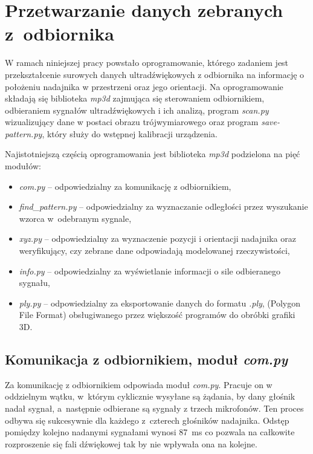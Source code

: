 
\chapter{Przetwarzanie danych zebranych z~odbiornika}

W ramach niniejszej pracy powstało oprogramowanie, którego zadaniem jest
przekształcenie surowych danych ultradźwiękowych 
z odbiornika na informację o położeniu nadajnika w przestrzeni oraz jego orientacji.
Na oprogramowanie składają się biblioteka \textit{mp3d} zajmująca się
sterowaniem odbiornikiem, odbieraniem sygnałów ultradźwiękowych i ich analizą, program \textit{scan.py}
wizualizujący dane w postaci obrazu trójwymiarowego oraz program \textit{save-pattern.py},
który służy do wstępnej kalibracji urządzenia.

Najistotniejszą częścią oprogramowania jest biblioteka \textit{mp3d} podzielona na pięć modułów:
\begin{itemize}
 \item \textit{com.py} --  odpowiedzialny za komunikację z odbiornikiem,
 \item \textit{find\_pattern.py} --  odpowiedzialny za wyznaczanie odległości przez wyszukanie wzorca w~odebranym sygnale,
 \item \textit{xyz.py} --  odpowiedzialny za wyznaczenie pozycji i orientacji nadajnika oraz  weryfikujący, 
 czy zebrane dane odpowiadają modelowanej rzeczywistości,
 \item \textit{info.py} --  odpowiedzialny za wyświetlanie informacji o sile odbieranego sygnału,
 \item \textit{ply.py} --  odpowiedzialny za eksportowanie danych do formatu \textit{.ply},
    (Polygon File Format) obsługiwanego przez większość programów do obróbki grafiki 3D.
\end{itemize}


\section{Komunikacja z odbiornikiem, moduł \textit{com.py}}

Za komunikację z odbiornikiem odpowiada moduł \textit{com.py}.
Pracuje on w oddzielnym wątku, w~którym cyklicznie wysyłane są żądania, by dany głośnik nadał sygnał,
a~następnie odbierane są sygnały z trzech mikrofonów.
Ten proces odbywa się sukcesywnie dla każdego z~czterech głośników nadajnika.
Odstęp pomiędzy kolejno nadanymi sygnałami wynosi \SI{87}{ms}
co pozwala na całkowite rozproszenie się fali dźwiękowej tak by nie wpływała ona na kolejne.

